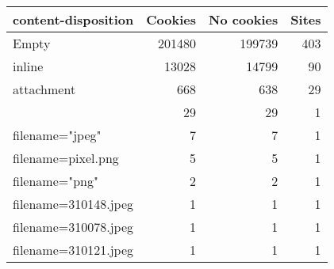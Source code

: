 \begin{tabular}{lrrr}
\toprule
 content-disposition &  Cookies &  No cookies &  Sites \\
\midrule
               Empty &   201480 &      199739 &    403 \\
              inline &    13028 &       14799 &     90 \\
          attachment &      668 &         638 &     29 \\
                     &       29 &          29 &      1 \\
     filename="jpeg" &        7 &           7 &      1 \\
  filename=pixel.png &        5 &           5 &      1 \\
      filename="png" &        2 &           2 &      1 \\
filename=310148.jpeg &        1 &           1 &      1 \\
filename=310078.jpeg &        1 &           1 &      1 \\
filename=310121.jpeg &        1 &           1 &      1 \\
\bottomrule
\end{tabular}
